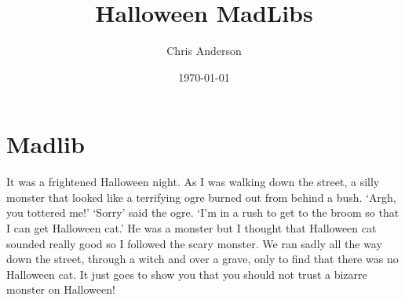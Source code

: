 \documentclass{article}
\title{Halloween MadLibs}
\author{Chris Anderson}
\date{\today}
\begin{document}
\maketitle

\section{Madlib}


It was a frightened Halloween night. As I was walking down the street, a silly  monster that looked like  a terrifying  ogre burned out from behind a bush. `Argh, you tottered me!' `Sorry' said the ogre. `I'm in a rush to get to the broom so that I can get Halloween cat.' He was a monster but I thought that Halloween cat sounded really good so I followed the scary  monster. We ran sadly all the way down the street, through a witch and over a grave, only to find that there was no Halloween cat. It just goes to show you that you should not trust a bizarre monster on Halloween!
\end{document}
